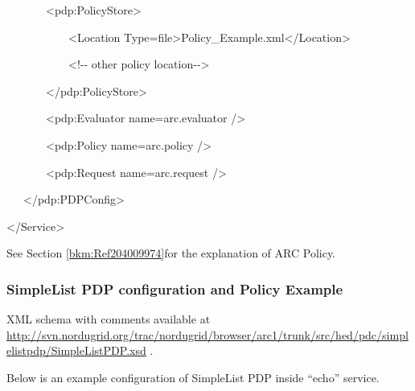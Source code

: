 \documentclass[a4paper]{article}
\newcommand\textstyleInternetlink[1]{\textcolor[rgb]{0.0,0.0,0.5019608}{#1}}
\begin{document}
{\ttfamily\color{black}
\ \ \ \ \ \ \ {\textless}pdp:PolicyStore{\textgreater}}

{\ttfamily\color{black}
\ \ \ \ \ \ \ \ \ \ \ {\textless}Location
Type={\textquotedbl}file{\textquotedbl}{\textgreater}Policy\_Example.xml{\textless}/Location{\textgreater}}

{\ttfamily\color{black}
\ \ \ \ \ \ \ \ \ \ \ {\textless}!-{}- other policy
location-{}-{\textgreater}}

{\ttfamily\color{black}
\ \ \ \ \ \ \ {\textless}/pdp:PolicyStore{\textgreater}}

{\ttfamily\color{black}
\ \ \ \ \ \ \ {\textless}pdp:Evaluator
name={\textquotedbl}arc.evaluator{\textquotedbl} /{\textgreater}}

{\ttfamily\color{black}
\ \ \ \ \ \ \ {\textless}pdp:Policy
name={\textquotedbl}arc.policy{\textquotedbl} /{\textgreater}}

{\ttfamily\color{black}
\ \ \ \ \ \ \ {\textless}pdp:Request
name={\textquotedbl}arc.request{\textquotedbl} /{\textgreater}}

{\ttfamily\color{black}
\ \ \ {\textless}/pdp:PDPConfig{\textgreater}}

{\ttfamily\color{black}
{\textless}/Service{\textgreater}}

{\upshape\color{black}
See Section \ref{bkm:Ref204009974}for the explanation of ARC Policy.}

\subsubsection{SimpleList PDP configuration and Policy Example}
{\upshape\color{black}
XML schema with comments available at
\href{http://svn.nordugrid.org/trac/nordugrid/browser/arc1/trunk/src/hed/pdc/simplelistpdp/SimpleListPDP.xsd}{\textstyleInternetlink{http://svn.nordugrid.org/trac/nordugrid/browser/arc1/trunk/src/hed/pdc/simplelistpdp/SimpleListPDP.}}\href{http://svn.nordugrid.org/trac/nordugrid/browser/arc1/trunk/src/hed/pdc/simplelistpdp/SimpleListPDP.xsd}{\textstyleInternetlink{xsd}}
.}

{\upshape\color{black}
Below is an example configuration of SimpleList PDP inside
{\textquotedblleft}echo{\textquotedblright} service.}
\end{document}
